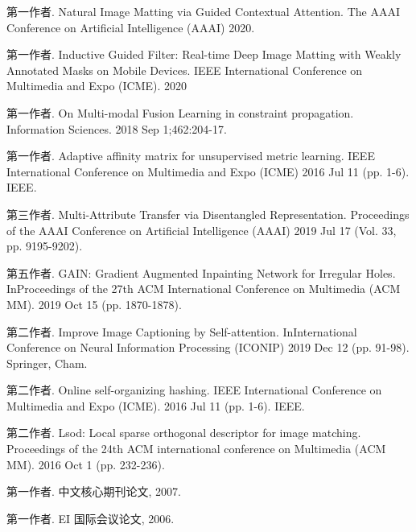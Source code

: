 

\begin{publications}
  \item 第一作者. Natural Image Matting via Guided Contextual Attention. The AAAI Conference on Artificial Intelligence (AAAI) 2020.
  \item 第一作者. Inductive Guided Filter: Real-time Deep Image Matting with Weakly Annotated Masks on Mobile Devices. IEEE International Conference on Multimedia and Expo (ICME). 2020
  \item 第一作者. On Multi-modal Fusion Learning in constraint propagation. Information Sciences. 2018 Sep 1;462:204-17.
  \item 第一作者. Adaptive affinity matrix for unsupervised metric learning. IEEE International Conference on Multimedia and Expo (ICME) 2016 Jul 11 (pp. 1-6). IEEE.
  \item 第三作者. Multi-Attribute Transfer via Disentangled Representation. Proceedings of the AAAI Conference on Artificial Intelligence (AAAI) 2019 Jul 17 (Vol. 33, pp. 9195-9202).
  \item 第五作者. GAIN: Gradient Augmented Inpainting Network for Irregular Holes. InProceedings of the 27th ACM International Conference on Multimedia (ACM MM). 2019 Oct 15 (pp. 1870-1878).
  \item 第二作者. Improve Image Captioning by Self-attention. InInternational Conference on Neural Information Processing (ICONIP) 2019 Dec 12 (pp. 91-98). Springer, Cham.
  \item 第二作者. Online self-organizing hashing. IEEE International Conference on Multimedia and Expo (ICME). 2016 Jul 11 (pp. 1-6). IEEE.
  \item 第二作者. Lsod: Local sparse orthogonal descriptor for image matching. Proceedings of the 24th ACM international conference on Multimedia (ACM MM). 2016 Oct 1 (pp. 232-236).
\end{publications}

\begin{publications*}
  \item 第一作者. 中文核心期刊论文, 2007.
  \item 第一作者. EI 国际会议论文, 2006.
\end{publications*}


